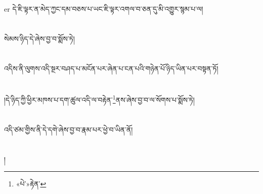 er{ }དེ་ཇི་ལྟར་ན་མེད་ཀྱང་དམ་བཅས་པ་ཡང་ཇི་ལྟར་འགལ་བ་ཅན་དུ་མི་འགྱུར་སྙམ་པ་ལ།\chapter{ }སེམས་ཉིད་དེ་ཞེས་བྱ་བ་སྨོས་ཏེ།\chapter{ }འདིས་ནི་ལུགས་འདི་སྔར་བཤད་པ་མངོན་པར་ཞེན་པ་ངན་པའི་གཉེན་པོ་ཉིད་ཡིན་པར་བསྟན་ཏོ།\chapter{ }།དེ་ཉིད་ཀྱི་ཕྱིར་མཁས་པ་དག་ཚུལ་འདི་ལ་བརྟེན་\footnote{«པེ་»རྟེན་}ནས་ཞེས་བྱ་བ་ལ་སོགས་པ་སྨོས་ཏེ།\chapter{ }འདི་ཙམ་གྱིས་ནི་དེ་དགེ་ཞེས་བྱ་བ་རྣམ་པར་ཕྱེ་བ་ཡིན་ནོ།\chapter{ }།